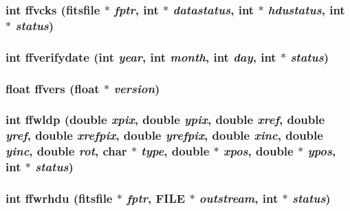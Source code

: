 \subsubsection{\setlength{\rightskip}{0pt plus 5cm}int ffvcks (\bf{fitsfile} $\ast$ {\em fptr}, int $\ast$ {\em datastatus}, int $\ast$ {\em hdustatus}, int $\ast$ {\em status})}\label{fitsio__64_8h_78bc390746f669a461a78c81ed6d188c}


\subsubsection{\setlength{\rightskip}{0pt plus 5cm}int ffverifydate (int {\em year}, int {\em month}, int {\em day}, int $\ast$ {\em status})}\label{fitsio__64_8h_80394f484665daa6cc2baf0176437ca8}


\subsubsection{\setlength{\rightskip}{0pt plus 5cm}float ffvers (float $\ast$ {\em version})}\label{fitsio__64_8h_85c66845501bf130675ce90fede1adb4}


\subsubsection{\setlength{\rightskip}{0pt plus 5cm}int ffwldp (double {\em xpix}, double {\em ypix}, double {\em xref}, double {\em yref}, double {\em xrefpix}, double {\em yrefpix}, double {\em xinc}, double {\em yinc}, double {\em rot}, char $\ast$ {\em type}, double $\ast$ {\em xpos}, double $\ast$ {\em ypos}, int $\ast$ {\em status})}\label{fitsio__64_8h_d38a3e4f83b4c618ce413d89f7115e45}


\subsubsection{\setlength{\rightskip}{0pt plus 5cm}int ffwrhdu (\bf{fitsfile} $\ast$ {\em fptr}, FILE $\ast$ {\em outstream}, int $\ast$ {\em status})}\label{fitsio__64_8h_9ad432500aed4437ea1991776af1f5e5}


